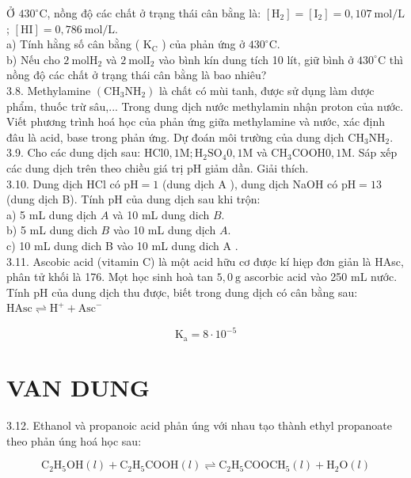 \documentclass[10pt]{article}
\begin{document}
Ở $430^{\circ} \mathrm{C}$, nồng độ các chất ở trạng thái cân bằng là: $\left[\mathrm{H}_{2}\right]=\left[\mathrm{I}_{2}\right]=0,107 \mathrm{~mol} / \mathrm{L}$; $[\mathrm{HI}]=0,786 \mathrm{~mol} / \mathrm{L}$.\\
a) Tính hằng số cân bằng ( $\mathrm{K}_{\mathrm{C}}$ ) của phản ứng ở $430^{\circ} \mathrm{C}$.\\
b) Nếu cho $2 \mathrm{~mol} \mathrm{H}_{2}$ và $2 \mathrm{~mol} \mathrm{I}_{2}$ vào bình kín dung tích 10 lít, giữ bình ở $430^{\circ} \mathrm{C}$ thì nồng độ các chất ở trạng thái cân bằng là bao nhiêu?\\
3.8. Methylamine $\left(\mathrm{CH}_{3} \mathrm{NH}_{2}\right)$ là chất có mùi tanh, được sử dụng làm dược phẩm, thuốc trừ sâu,... Trong dung dịch nước methylamin nhận proton của nước. Viết phương trình hoá học của phản ứng giữa methylamine và nước, xác định đâu là acid, base trong phản ứng. Dự đoán môi trường của dung dịch $\mathrm{CH}_{3} \mathrm{NH}_{2}$.\\
3.9. Cho các dung dịch sau: $\mathrm{HCl} 0,1 \mathrm{M} ; \mathrm{H}_{2} \mathrm{SO}_{4} 0,1 \mathrm{M}$ và $\mathrm{CH}_{3} \mathrm{COOH} 0,1 \mathrm{M}$. Sáp xếp các dung dịch trên theo chiều giá trị pH giảm dần. Giải thích.\\
3.10. Dung dịch HCl có $\mathrm{pH}=1$ (dung dịch A ), dung dịch NaOH có $\mathrm{pH}=13$ (dung dịch B). Tính pH của dung dịch sau khi trộn:\\
a) 5 mL dung dịch $A$ và 10 mL dung dich $B$.\\
b) 5 mL dung dich $B$ vào 10 mL dung dịch $A$.\\
c) 10 mL dung dich B vào 10 mL dung dich A .\\
3.11. Ascobic acid (vitamin C) là một acid hữu cơ được kí hięp đơn giản là HAsc, phân tử khối là 176. Mọt học sinh hoà tan $5,0 \mathrm{~g}$ ascorbic acid vào 250 mL nước. Tính pH của dung dịch thu được, biết trong dung dịch có cân bằng sau:\\
$\mathrm{HAsc} \rightleftharpoons \mathrm{H}^{+}+\mathrm{Asc}^{-}$

$$
\mathrm{K}_{\mathrm{a}}=8 \cdot 10^{-5}
$$

\section*{VAN DUNG}
3.12. Ethanol và propanoic acid phån úng với nhau tạo thành ethyl propanoate theo phản úng hoá học sau:

$$
\mathrm{C}_{2} \mathrm{H}_{5} \mathrm{OH}(l)+\mathrm{C}_{2} \mathrm{H}_{5} \mathrm{COOH}(l) \rightleftharpoons \mathrm{C}_{2} \mathrm{H}_{5} \mathrm{COOC} \mathrm{H}_{5}(l)+\mathrm{H}_{2} \mathrm{O}(l)
$$
\end{document}
